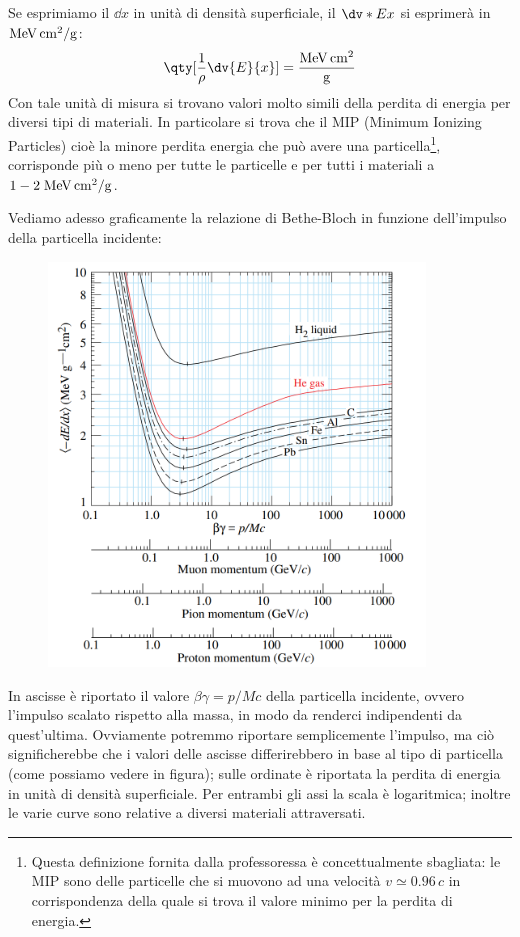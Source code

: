 Se esprimiamo il $\dd{x}$ in unità di densità superficiale, il $\dv*{E}{x}$ si esprimerà in $\rm MeV \, cm^2/g$:
\begin{equation*}
    \qty[ \frac{1}{\rho} \dv{E}{x} ]=\rm \frac{MeV \, cm^2}{g}
\end{equation*}
Con tale unità di misura si trovano valori molto simili della perdita di energia per diversi tipi di materiali. In particolare si trova che il MIP (Minimum Ionizing Particles) cioè la minore perdita energia che può avere una particella\footnote{Questa definizione fornita dalla professoressa è concettualmente sbagliata: le MIP sono delle particelle che si muovono ad una velocità $v \simeq 0.96 \, c$ in corrispondenza della quale si trova il valore minimo per la perdita di energia.}, corrisponde più o meno per tutte le particelle e per tutti i materiali a $1-2 \; \rm MeV \, cm^2/g$.

Vediamo adesso graficamente la relazione di Bethe-Bloch in funzione dell'impulso della particella incidente:
\begin{figure}[H]
    \centering
    \includegraphics[width=10cm]{immagini/grafico_bethe_bloch.png}
\end{figure}
In ascisse è riportato il valore $\beta\gamma=p/Mc$ della particella incidente, ovvero l'impulso scalato rispetto alla massa, in modo da renderci indipendenti da quest'ultima. Ovviamente potremmo riportare semplicemente l'impulso, ma ciò significherebbe che i valori delle ascisse differirebbero in base al tipo di particella (come possiamo vedere in figura); sulle ordinate è riportata la perdita di energia in unità di densità superficiale. Per entrambi gli assi la scala è logaritmica; inoltre le varie curve sono relative a diversi materiali attraversati.

